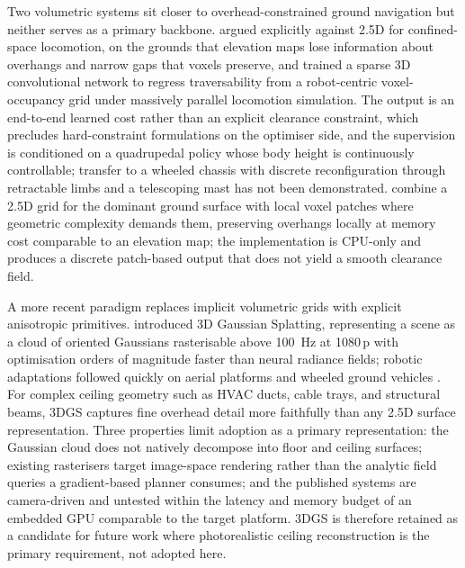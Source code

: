 \documentclass[11pt,a4paper]{article}
\begin{document}
Two volumetric systems sit closer to overhead-constrained ground navigation but neither serves as a primary backbone. \citet{freyLocomotionPolicyGuided2022} argued explicitly against 2.5D for confined-space locomotion, on the grounds that elevation maps lose information about overhangs and narrow gaps that voxels preserve, and trained a sparse 3D convolutional network to regress traversability from a robot-centric voxel-occupancy grid under massively parallel locomotion simulation. The output is an end-to-end learned cost rather than an explicit clearance constraint, which precludes hard-constraint formulations on the optimiser side, and the supervision is conditioned on a quadrupedal policy whose body height is continuously controllable; transfer to a wheeled chassis with discrete reconfiguration through retractable limbs and a telescoping mast has not been demonstrated. \citet{garroteHMAPsHybridHeight2018} combine a 2.5D grid for the dominant ground surface with local voxel patches where geometric complexity demands them, preserving overhangs locally at memory cost comparable to an elevation map; the implementation is CPU-only and produces a discrete patch-based output that does not yield a smooth clearance field.

A more recent paradigm replaces implicit volumetric grids with explicit anisotropic primitives. \citet{kerbl20233dgs} introduced 3D Gaussian Splatting, representing a scene as a cloud of oriented Gaussians rasterisable above \SI{100}{\hertz} at 1080\,p with optimisation orders of magnitude faster than neural radiance fields; robotic adaptations followed quickly on aerial platforms \citep{chenSplatNavSafeRealTime2025} and wheeled ground vehicles \citep{taoRTGuIDERealTimeGaussian2025}. For complex ceiling geometry such as HVAC ducts, cable trays, and structural beams, 3DGS captures fine overhead detail more faithfully than any 2.5D surface representation. Three properties limit adoption as a primary representation: the Gaussian cloud does not natively decompose into floor and ceiling surfaces; existing rasterisers target image-space rendering rather than the analytic field queries a gradient-based planner consumes; and the published systems are camera-driven and untested within the latency and memory budget of an embedded GPU comparable to the target platform. 3DGS is therefore retained as a candidate for future work where photorealistic ceiling reconstruction is the primary requirement, not adopted here.
\end{document}
